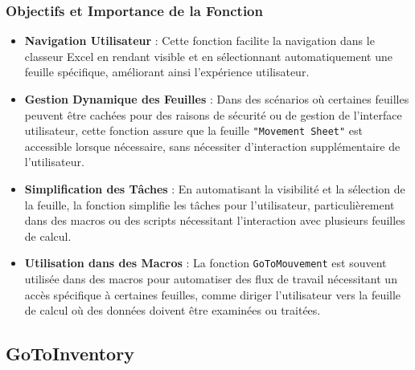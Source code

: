 \documentclass[a4paper, oneside, 12pt, final]{extreport}
\begin{document}
\begin{itemize}
\subsubsection{Objectifs et Importance de la Fonction}
\begin{itemize}
    \item \textbf{Navigation Utilisateur} : Cette fonction facilite la navigation dans le classeur Excel en rendant visible et en sélectionnant automatiquement une feuille spécifique, améliorant ainsi l'expérience utilisateur.
    \item \textbf{Gestion Dynamique des Feuilles} : Dans des scénarios où certaines feuilles peuvent être cachées pour des raisons de sécurité ou de gestion de l'interface utilisateur, cette fonction assure que la feuille \texttt{"Movement Sheet"} est accessible lorsque nécessaire, sans nécessiter d'interaction supplémentaire de l'utilisateur.
    \item \textbf{Simplification des Tâches} : En automatisant la visibilité et la sélection de la feuille, la fonction simplifie les tâches pour l'utilisateur, particulièrement dans des macros ou des scripts nécessitant l'interaction avec plusieurs feuilles de calcul.
    \item \textbf{Utilisation dans des Macros} : La fonction \texttt{GoToMouvement} est souvent utilisée dans des macros pour automatiser des flux de travail nécessitant un accès spécifique à certaines feuilles, comme diriger l'utilisateur vers la feuille de calcul où des données doivent être examinées ou traitées.
\end{itemize}
\end{itemize}

\subsection{GoToInventory}
\end{document}
